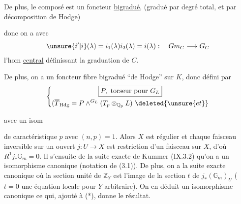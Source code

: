 De plus, le composé
est un foncteur \uline{bigradué},  (gradué par degré total, et par décomposition de Hodge)

donc on a
avec
\[
\unsure{i'|i}(\lambda)=i_1(\lambda)i_2(\lambda)=i(\lambda):\quad Gm_C\longrightarrow G_C
\]
l'hom \uline{central} définissant la graduation de $C$.

De plus, on a un  foncteur fibre  bigradué ``de Hodge'' sur $K$, donc défini par
\[
\left\{\begin{gathered}
\boxed{P,\ \text{torseur pour }G_L}\\
(\overline T_{\mathrm{Hdg}}=P\mathbin{\wedge}^{G_L}(T_p\otimes_{\mathbb Q_p}L)\ \deleted{\unsure{et}}
\end{gathered}\right.
\]
\diagram{\[
\left\{\begin{gathered}
\begin{tikzcd}
Gm_L\arrow[r,shift left=.6ex,"j_1"]\arrow[r,shift right=.6ex,"j_2"']&\deleted{\unsure{G'}}G_L^P=\operatorname{ad}(P)
\end{tikzcd}\\
j_1(\lambda)j_2(\lambda)=i(\lambda)
\end{gathered}\right.
\]}

avec un isom

de caractéristique $p$ avec $(n,p)=1$. Alors $X$ est régulier et chaque faisceau inversible sur un ouvert $j:U\longrightarrow X$ est restriction d'un faisceau sur $X$, d'où $R^1j_*\mathbb G_m=0$. Il s'ensuite de la suite exacte de Kummer (IX.3.2) qu'on a un isomorphisme canonique
(notation de (3.1)). De plus, on a la suite exacte canonique
où la section unité de  $\mathbb Z_Y$ est l'image de la section $t$ de $j_*(\mathbb G_m)_U$ ($t=0$ une équation locale pour $Y$ arbitraire). On en déduit un isomorphisme canonique
 ce qui, ajouté à (*), donne le résultat.

